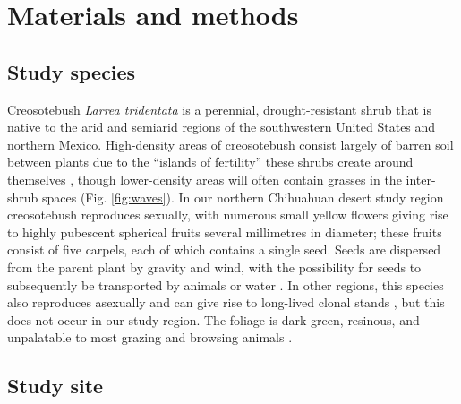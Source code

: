 \documentclass[11pt]{article}\usepackage[]{graphicx}\usepackage[usenames,dvipsnames]{xcolor}
\begin{document}
\section*{Materials and methods}

\subsection*{Study species}

Creosotebush \textit{Larrea tridentata} is a perennial, drought-resistant  shrub that is native to the arid and semiarid regions of the southwestern United States and northern Mexico.
High-density areas of creosotebush consist largely of barren soil between plants due to the ``islands of fertility'' these shrubs create around themselves \citep{schlesinger1996spatial, reynolds1999impact}, though lower-density areas will often contain grasses in the inter-shrub spaces (Fig. \ref{fig:waves}).
In our northern Chihuahuan desert study region creosotebush reproduces sexually, with numerous small yellow flowers giving rise to highly pubescent spherical fruits several millimetres in diameter; these fruits consist of five carpels, each of which contains a single seed.
Seeds are dispersed from the parent plant by gravity and wind, with the possibility for seeds to subsequently be transported by animals or water \citep{maddox1985wind}. 
In other regions, this species also reproduces asexually and can give rise to long-lived clonal stands \citep{vasek1980creosote}, but this does not occur in our study region.
The foliage is dark green, resinous, and unpalatable to most grazing and browsing animals \citep{mabry1978creosote}.

\subsection*{Study site}
\end{document}
